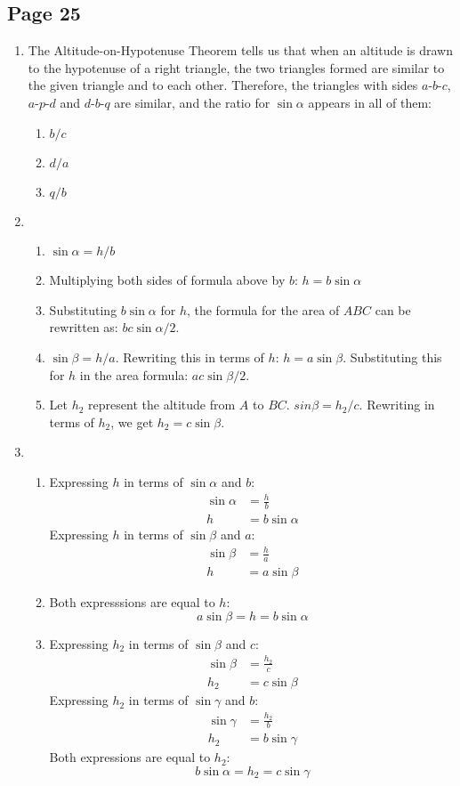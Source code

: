 \documentclass{article}
\newenvironment{solutions}[1]
{\subsection*{#1}
 \begin{enumerate}[leftmargin=1.5em]}
{\end{enumerate}}
\newcommand{\solution}{\item}
\newenvironment{subsolutions}
{\begin{enumerate}}
{\end{enumerate}}
\newcommand{\subsolution}{\item}
\begin{document}
\begin{solutions}{Page 25}
\solution %
The Altitude-on-Hypotenuse Theorem tells us that when an altitude is drawn to the hypotenuse of a right triangle, the two triangles formed are similar to the given triangle and to each other. Therefore, the triangles with sides $a$-$b$-$c$, $a$-$p$-$d$ and $d$-$b$-$q$ are similar, and the ratio for $\sin{\alpha}$ appears in all of them:
\begin{subsolutions}
\subsolution $b/c$
\subsolution $d/a$
\subsolution $q/b$
\end{subsolutions}

\solution %
\begin{subsolutions}
\subsolution $\sin{\alpha} = h/b$
\subsolution Multiplying both sides of formula above by $b$: $h = b\sin{\alpha}$
\subsolution Substituting $b\sin{\alpha}$ for $h$, the formula for the area of $ABC$ can be rewritten as: $bc\sin{\alpha}/2$.
\subsolution $\sin{\beta} = h/a$. Rewriting this in terms of $h$: $h = a\sin{\beta}$. Substituting this for $h$ in the area formula: $ac\sin{\beta}/2$.
\subsolution Let $h_{2}$ represent the altitude from $A$ to $BC$. $sin{\beta} = h_{2}/c$. Rewriting in terms of $h_{2}$, we get $h_{2} = c\sin{\beta}$. 
\end{subsolutions}

\solution %
\begin{subsolutions}
\subsolution
Expressing $h$ in terms of $\sin{\alpha}$ and $b$: 
\begin{align*}
\sin{\alpha} &= \frac{h}{b}\\
h &= b\sin{\alpha}
\end{align*}
Expressing $h$ in terms of $\sin{\beta}$ and $a$:
\begin{align*}
\sin{\beta} &= \frac{h}{a}\\
h &= a\sin{\beta}
\end{align*}

\subsolution
Both expresssions are equal to $h$:
\begin{equation*}
a\sin{\beta} = h = b\sin{\alpha}
\end{equation*}

\subsolution
Expressing $h_{2}$ in terms of $\sin{\beta}$ and $c$: 
\begin{align*}
\sin{\beta} &= \frac{h_{2}}{c}\\
h_{2} &= c\sin{\beta}
\end{align*}
Expressing $h_{2}$ in terms of $\sin{\gamma}$ and $b$:
\begin{align*}
\sin{\gamma} &= \frac{h_{2}}{b}\\
h_{2} &= b\sin{\gamma}
\end{align*}
Both expressions are equal to $h_{2}$:
\begin{equation*}
b\sin{\alpha} = h_{2} = c\sin{\gamma}
\end{equation*}


\end{subsolutions}
\end{solutions}
\end{document}
